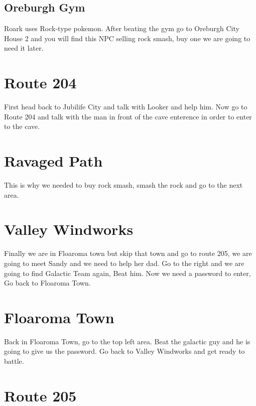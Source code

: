 \documentclass[11pt]{article}
\begin{document}
\subsection{Oreburgh Gym}\label{subsec:oreburgh-gym}
Roark uses Rock-type pokemon.
After beating the gym go to Oreburgh City House 2 and you will find this NPC
selling rock smash, buy one we are going to need it later.

\section{Route 204}\label{sec:Route_204}

First head back to Jubilife City and talk with Looker and help him.
Now go to Route 204 and talk with the man in front of the cave enterence
in order to enter to the cave.



\section{Ravaged Path}\label{sec:Ravaged_Path}

This is why we needed to buy rock smash, smash the rock and go to the next area.



\section{Valley Windworks}\label{sec:valley-windworks}

Finally we are in Floaroma town but skip that town and go to route 205,
we are going to meet Sandy and we need to help her dad.
Go to the right and we are going to find Galactic Team again, Beat him.
Now we need a password to enter, Go back to Floaroma Town.



\section{Floaroma Town}\label{sec:floaroma-town}

Back in Floaroma Town, go to the top left area.
Beat the galactic guy and he is going to give us the password.
Go back to Valley Windworks and get ready to battle.

\section{Route 205}\label{sec:Route_205}
\end{document}
